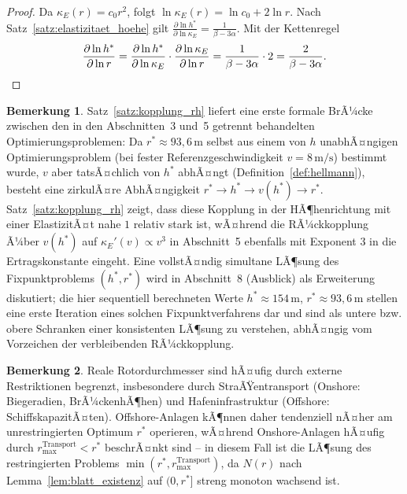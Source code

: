 ﻿\documentclass[a4paper,12pt]{article}
\theoremstyle{definition}
\newtheorem{bemerkung}{Bemerkung}
\begin{document}
\begin{proof}
Da $\kappa_E(r)=c_0 r^2$, folgt $\ln\kappa_E(r) = \ln c_0 + 2\ln r$. Nach Satz~\ref{satz:elastizitaet_hoehe} gilt $\frac{\partial\ln h^*}{\partial\ln\kappa_E}=\frac{1}{\beta-3\alpha}$. Mit der Kettenregel
\[
\frac{\partial\ln h^*}{\partial \ln r} = \frac{\partial\ln h^*}{\partial\ln\kappa_E}\cdot\frac{\partial\ln\kappa_E}{\partial\ln r} = \frac{1}{\beta-3\alpha}\cdot 2 = \frac{2}{\beta-3\alpha}. \qedhere
\]
\end{proof}

\begin{bemerkung}
Satz~\ref{satz:kopplung_rh} liefert eine erste formale BrÃ¼cke zwischen den in den Abschnitten~3 und~5 getrennt behandelten Optimierungsproblemen: Da $r^*\approx93{,}6\,\mathrm{m}$ selbst aus einem von $h$ unabhÃ¤ngigen Optimierungsproblem (bei fester Referenzgeschwindigkeit $v=8\,\mathrm{m/s}$) bestimmt wurde, $v$ aber tatsÃ¤chlich von $h^*$ abhÃ¤ngt (Definition~\ref{def:hellmann}), besteht eine zirkulÃ¤re AbhÃ¤ngigkeit $r^*\to h^*\to v(h^*)\to r^*$. Satz~\ref{satz:kopplung_rh} zeigt, dass diese Kopplung in der HÃ¶henrichtung mit einer ElastizitÃ¤t nahe $1$ relativ stark ist, wÃ¤hrend die RÃ¼ckkopplung Ã¼ber $v(h^*)$ auf $\kappa_E'(v)\propto v^3$ in Abschnitt~5 ebenfalls mit Exponent $3$ in die Ertragskonstante eingeht. Eine vollstÃ¤ndig simultane LÃ¶sung des Fixpunktproblems $(h^*,r^*)$ wird in Abschnitt~8 (Ausblick) als Erweiterung diskutiert; die hier sequentiell berechneten Werte $h^*\approx154\,\mathrm{m}$, $r^*\approx93{,}6\,\mathrm{m}$ stellen eine erste Iteration eines solchen Fixpunktverfahrens dar und sind als untere bzw. obere Schranken einer konsistenten LÃ¶sung zu verstehen, abhÃ¤ngig vom Vorzeichen der verbleibenden RÃ¼ckkopplung.
\end{bemerkung}

\begin{bemerkung}
Reale Rotordurchmesser sind hÃ¤ufig durch externe Restriktionen begrenzt, insbesondere durch StraÃŸentransport (Onshore: Biegeradien, BrÃ¼ckenhÃ¶hen) und Hafeninfrastruktur (Offshore: SchiffskapazitÃ¤ten). Offshore-Anlagen kÃ¶nnen daher tendenziell nÃ¤her am unrestringierten Optimum $r^*$ operieren, wÃ¤hrend Onshore-Anlagen hÃ¤ufig durch $r_{\max}^{\mathrm{Transport}} < r^*$ beschrÃ¤nkt sind -- in diesem Fall ist die LÃ¶sung des restringierten Problems $\min(r^*, r_{\max}^{\mathrm{Transport}})$, da $N(r)$ nach Lemma~\ref{lem:blatt_existenz} auf $(0,r^*]$ streng monoton wachsend ist.
\end{bemerkung}
\end{document}
